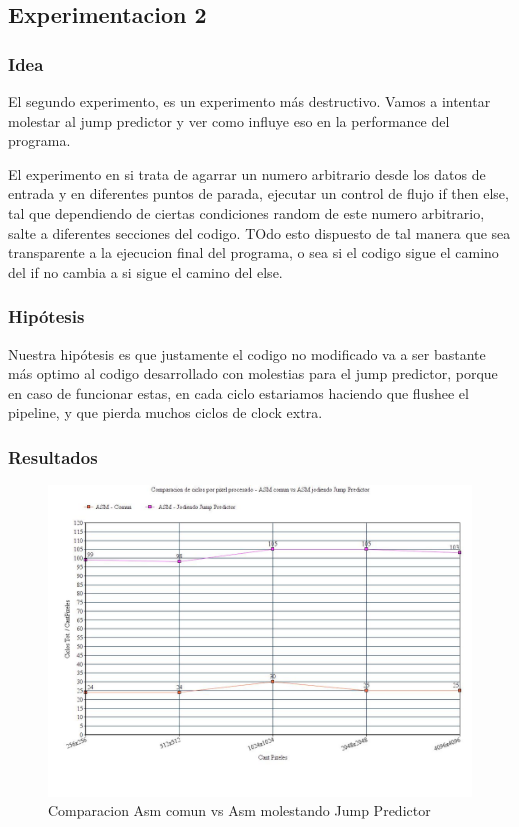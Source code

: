 \subsection{Experimentacion 2}	

\subsubsection{Idea}
\par{El segundo experimento, es un experimento más destructivo. Vamos a intentar molestar al jump predictor y ver como influye eso en la  performance del programa.}
\par{El experimento en si trata de agarrar un numero arbitrario desde los datos de entrada y en diferentes puntos de parada, ejecutar un control de flujo if then else, tal que dependiendo de ciertas condiciones random de este numero arbitrario, salte  a diferentes secciones del codigo. TOdo esto dispuesto de tal manera que sea transparente a la ejecucion final del programa, o sea si el codigo sigue el camino del if no cambia a si sigue el camino del else.}

\subsubsection{Hipótesis}
\par{Nuestra hipótesis es que justamente el codigo no modificado va a ser bastante más optimo al codigo desarrollado con molestias para el jump predictor, porque en caso de funcionar estas, en cada ciclo estariamos haciendo que flushee el pipeline, y que pierda muchos ciclos de clock extra.}
	
\subsubsection{Resultados}

\medskip\begin{figure}[h!]
\centering
\captionsetup{justification=centering}
	\includegraphics[width = 15 cm, height = 8 cm]{imagenes/JumpPredictor.jpg}
	\caption[center]{Comparacion Asm comun vs Asm molestando Jump Predictor}
\end{figure}

